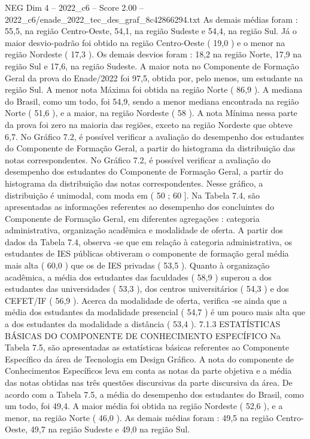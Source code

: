 \begin{textsample}{NEG Dim 4 – 2022\_c6 – Score 2.00 – 2022\_c6/enade\_2022\_tec\_des\_graf\_8c42866294.txt}
As demais médias foram : 55,5, na região Centro-Oeste, 54,1, na região Sudeste e 54,4, na região Sul.
Já o maior desvio-padrão foi obtido na região Centro-Oeste ( 19,0 ) e o menor na região Nordeste ( 17,3 ).
Os demais desvios foram : 18,2 na região Norte, 17,9 na região Sul e 17,6, na região Sudeste.
A maior nota no Componente de Formação Geral da prova do Enade/2022 foi 97,5, obtida por, pelo menos, um estudante na região Sul.
A menor nota Máxima foi obtida na região Norte ( 86,9 ).
A mediana do Brasil, como um todo, foi 54,9, sendo a menor mediana encontrada na região Norte ( 51,6 ), e a maior, na região Nordeste ( 58 ).
A nota Mínima nessa parte da prova foi zero na maioria das regiões, exceto na região Nordeste que obteve 6,7.
No Gráfico 7.2, é possível verificar a avaliação do desempenho dos estudantes do Componente de Formação Geral, a partir do histograma da distribuição das notas correspondentes.
No Gráfico 7.2, é possível verificar a avaliação do desempenho dos estudantes do Componente de Formação Geral, a partir do histograma da distribuição das notas correspondentes.
Nesse gráfico, a distribuição é unimodal, com moda em ( 50 ; 60 ].
Na Tabela 7.4, são apresentadas as informações referentes ao desempenho dos concluintes do Componente de Formação Geral, em diferentes agregações : categoria administrativa, organização acadêmica e modalidade de oferta.
A partir dos dados da Tabela 7.4, observa -se que em relação à categoria administrativa, os estudantes de IES públicas obtiveram o componente de formação geral média mais alta ( 60,0 ) que os de IES privadas ( 53,5 ).
Quanto à organização acadêmica, a média dos estudantes das faculdades ( 58,9 ) superou a dos estudantes das universidades ( 53,3 ), dos centros universitários ( 54,3 ) e dos CEFET/IF ( 56,9 ).
Acerca da modalidade de oferta, verifica -se ainda que a média dos estudantes da modalidade presencial ( 54,7 ) é um pouco mais alta que a dos estudantes da modalidade a distância ( 53,4 ). 7.1.3 ESTATÍSTICAS BÁSICAS DO COMPONENTE DE CONHECIMENTO ESPECÍFICO Na Tabela 7.5, são apresentadas as estatísticas básicas referentes ao Componente Específico da área de Tecnologia em Design Gráfico.
A nota do componente de Conhecimentos Específicos leva em conta as notas da parte objetiva e a média das notas obtidas nas três questões discursivas da parte discursiva da área.
De acordo com a Tabela 7.5, a média do desempenho dos estudantes do Brasil, como um todo, foi 49,4.
A maior média foi obtida na região Nordeste ( 52,6 ), e a menor, na região Norte ( 46,0 ).
As demais médias foram : 49,5 na região Centro-Oeste, 49,7 na região Sudeste e 49,0 na região Sul.

\end{textsample}
